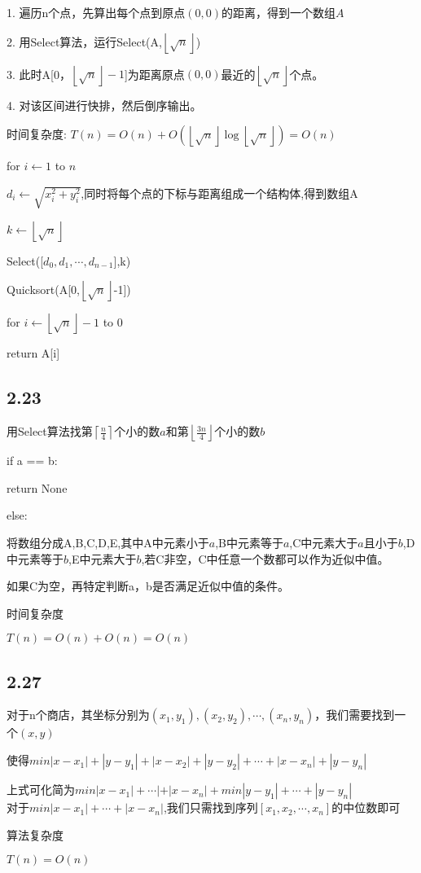 \documentclass[a4paper]{article}
\begin{document}
1. 遍历n个点，先算出每个点到原点$(0,0)$的距离，得到一个数组$A$

2. 用Select算法，运行Select(A,$\left \lfloor \sqrt{n} \right \rfloor$)

3. 此时A[0，$\left \lfloor \sqrt{n} \right \rfloor - 1$]为距离原点$(0,0)$最近的$\left \lfloor \sqrt{n} \right \rfloor$个点。

4. 对该区间进行快排，然后倒序输出。

时间复杂度:
$T(n)=O(n)+O(\left \lfloor \sqrt{n} \right \rfloor \log \left \lfloor \sqrt{n} \right \rfloor)=O(n)$

for $i \leftarrow 1$ to $n$

$d_i \leftarrow \sqrt{x_i^2+y_i^2}$,同时将每个点的下标与距离组成一个结构体,得到数组A

$k \leftarrow \left \lfloor \sqrt{n} \right \rfloor$

Select([$d_0,d_1,\cdots,d_{n-1}$],k)

Quicksort(A[0,$\left \lfloor \sqrt{n} \right \rfloor$-1])

for $i \leftarrow \left \lfloor \sqrt{n} \right \rfloor - 1$ to $0$

return A[i] 
\subsection*{2.23}

用Select算法找第$\left \lceil \frac{n}{4} \right \rceil$个小的数$a$和第$\left \lfloor \frac{3n}{4} \right \rfloor$个小的数$b$

if a == b:

 return None

else:

将数组分成A,B,C,D,E,其中A中元素小于$a$,B中元素等于$a$,C中元素大于$a$且小于$b$,D中元素等于$b$,E中元素大于$b$,若C非空，C中任意一个数都可以作为近似中值。

如果C为空，再特定判断a，b是否满足近似中值的条件。

时间复杂度

$T(n)=O(n)+O(n)=O(n)$

\subsection*{2.27}
对于n个商店，其坐标分别为$(x_1,y_1),(x_2,y_2),\cdots,(x_n,y_n)$，我们需要找到一个$(x,y)$

使得$min{|x-x_1|+|y-y_1|+|x-x_2|+|y-y_2|+\cdots+|x-x_n|+|y-y_n|}$

上式可化简为$min{|x-x_1|+\cdots|+|x-x_n|} + min{|y-y_1|+\cdots+|y-y_n|}$
$对于min{|x-x_1|+\cdots+|x-x_n|}$,我们只需找到序列$[x_1,x_2,\cdots,x_n]$的中位数即可

算法复杂度 

$T(n)=O(n)$
\end{document}

